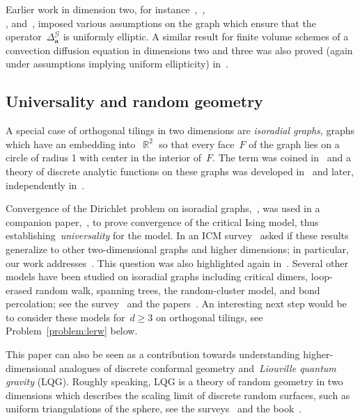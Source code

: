 \documentclass[12pt]{amsart}
\numberwithin{equation}{section}
\DeclareMathOperator{\R}{\mathbb{R}}
\newcommand{\aDelta}{\hyperref[eq:geometric-laplacian]{{\Delta^{\mathcal{G}}_{\cond}}}}
\newcommand{\cond}{\hyperref[eq:geometric-laplacian]{\mathbf{a}}}
\begin{document}
Earlier work in dimension two, for instance~\cite{MR1692623},~\cite{chelkaksmirnov}, \\ \cite{skopenkov2013boundary}, and~\cite{werness2015discrete}, imposed various assumptions on the graph which ensure that the operator~$\aDelta$ is uniformly elliptic. A similar result for finite volume schemes of a convection diffusion equation in dimensions two and three was also proved (again under assumptions implying uniform ellipticity) in~\cite[Corollary 1]{MR1863279}.



\subsection{Universality and random geometry} 
\label{subsec:universality}
A special case of orthogonal tilings in two dimensions are \emph{isoradial graphs}, graphs which have an embedding into~$\R^2$ so that every face~$F$ of the graph lies on a circle of radius 1 with center in the interior of~$F$.  The term was coined in~\cite{kenyon2002} and a theory of discrete analytic functions on these graphs was developed in~\cite{duffin} and later, independently in~\cite{mercat}. 

Convergence of the Dirichlet problem on isoradial graphs,~\cite{chelkaksmirnov}, was used in a companion paper,~\cite{MR2957303}, to prove
convergence of the critical Ising model, thus establishing~\emph{universality} for the model. 
In an ICM survey~\cite{smirnovicm} asked if these results generalize to other two-dimensional graphs and higher dimensions; in particular, our work addresses~\cite[Questions 1 and 12]{smirnovicm}. This question was also highlighted again in~\cite[Problem 5.9]{skopenkov2013boundary}. 
Several other models have been studied on isoradial graphs including critical dimers, loop-erased random walk, spanning trees, the random-cluster model, and bond percolation; see the survey~\cite{MR3372861} and the papers~\cite{MR3252428, MR3201923,MR3621833, MR3858924}. An interesting next step would be to consider these models for~$d \geq 3$
on orthogonal tilings, see Problem~\ref{problem:lerw} below.

This paper can also be seen as a contribution towards understanding higher-dimensional analogues of discrete conformal geometry and~\emph{Liouville quantum gravity} (LQG). Roughly speaking, LQG is a theory of random geometry in two dimensions which describes the scaling limit of discrete random surfaces, such as uniform triangulations of the sphere, see the surveys~\cite{GwynneSurvey, MR4680280} and the book~\cite{berestycki2024gaussian}. 
\end{document}
